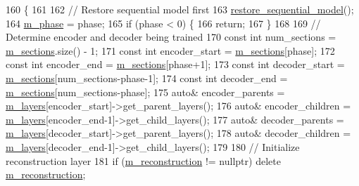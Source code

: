 \begin{DoxyCode}
160                                                       \{
161 
162   \textcolor{comment}{// Restore sequential model first}
163   \hyperlink{classlbann_1_1greedy__layerwise__autoencoder_a82b8ced756904a2423a65cd0e329b4e2}{restore\_sequential\_model}();
164   \hyperlink{classlbann_1_1greedy__layerwise__autoencoder_a1baf1b5e7fdb5d006f443edbb0bb2973}{m\_phase} = phase;
165   \textcolor{keywordflow}{if} (phase < 0) \{
166     \textcolor{keywordflow}{return};
167   \}
168 
169   \textcolor{comment}{// Determine encoder and decoder being trained}
170   \textcolor{keyword}{const} \textcolor{keywordtype}{int} num\_sections = \hyperlink{classlbann_1_1greedy__layerwise__autoencoder_aacb3dbf01c38f46a32927722420c5d41}{m\_sections}.size() - 1;
171   \textcolor{keyword}{const} \textcolor{keywordtype}{int} encoder\_start = \hyperlink{classlbann_1_1greedy__layerwise__autoencoder_aacb3dbf01c38f46a32927722420c5d41}{m\_sections}[phase];
172   \textcolor{keyword}{const} \textcolor{keywordtype}{int} encoder\_end = \hyperlink{classlbann_1_1greedy__layerwise__autoencoder_aacb3dbf01c38f46a32927722420c5d41}{m\_sections}[phase+1];
173   \textcolor{keyword}{const} \textcolor{keywordtype}{int} decoder\_start = \hyperlink{classlbann_1_1greedy__layerwise__autoencoder_aacb3dbf01c38f46a32927722420c5d41}{m\_sections}[num\_sections-phase-1];
174   \textcolor{keyword}{const} \textcolor{keywordtype}{int} decoder\_end = \hyperlink{classlbann_1_1greedy__layerwise__autoencoder_aacb3dbf01c38f46a32927722420c5d41}{m\_sections}[num\_sections-phase];
175   \textcolor{keyword}{auto}& encoder\_parents = \hyperlink{classlbann_1_1model_a0229fc226ec163d1411548446104569d}{m\_layers}[encoder\_start]->get\_parent\_layers();
176   \textcolor{keyword}{auto}& encoder\_children = \hyperlink{classlbann_1_1model_a0229fc226ec163d1411548446104569d}{m\_layers}[encoder\_end-1]->get\_child\_layers();
177   \textcolor{keyword}{auto}& decoder\_parents = \hyperlink{classlbann_1_1model_a0229fc226ec163d1411548446104569d}{m\_layers}[decoder\_start]->get\_parent\_layers();
178   \textcolor{keyword}{auto}& decoder\_children = \hyperlink{classlbann_1_1model_a0229fc226ec163d1411548446104569d}{m\_layers}[decoder\_end-1]->get\_child\_layers();
179 
180   \textcolor{comment}{// Initialize reconstruction layer}
181   \textcolor{keywordflow}{if} (\hyperlink{classlbann_1_1greedy__layerwise__autoencoder_a8238d2e3e723543c8b6f7f5c61a9ca06}{m\_reconstruction} != \textcolor{keyword}{nullptr}) \textcolor{keyword}{delete} \hyperlink{classlbann_1_1greedy__layerwise__autoencoder_a8238d2e3e723543c8b6f7f5c61a9ca06}{m\_reconstruction};

\end{DoxyCode}
